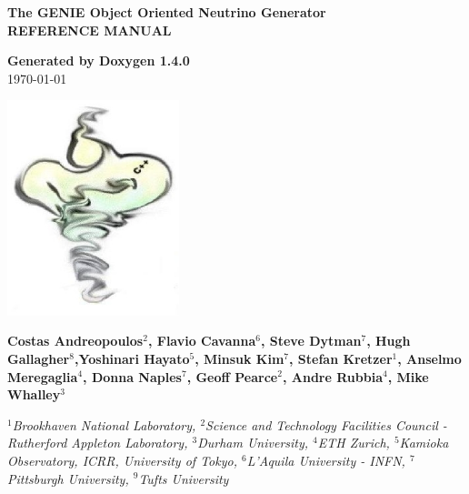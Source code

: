 \documentclass[a4paper]{book}
\begin{document}
\begin{titlepage}
\vspace*{3cm}
\begin{center}

{\Large \textbf{The GENIE Object Oriented Neutrino Generator}}\\
\vspace*{1cm}
{\Large \textbf{REFERENCE MANUAL}}\\
\vspace*{1cm}

{\large \textbf{Generated by Doxygen 1.4.0}}\\
\vspace*{0.5cm}
{\large \today}\\
\vspace*{1cm}

\includegraphics[width=5cm,keepaspectratio]{../../data/logo/genie_logo.eps}

\vspace*{0.6cm}

{\textbf{Costas Andreopoulos$^{2}$, Flavio Cavanna$^{6}$, Steve Dytman$^{7}$,
Hugh Gallagher$^{8}$,Yoshinari Hayato$^{5}$, Minsuk Kim$^{7}$, Stefan Kretzer$^{1}$, Anselmo Meregaglia$^{4}$,
Donna Naples$^{7}$, Geoff Pearce$^{2}$, Andre Rubbia$^{4}$, Mike Whalley$^{3}$}}\\
\vspace*{0.5cm}

{\textit{
$^{1}$Brookhaven National Laboratory, 
$^{2}$Science and Technology Facilities Council - Rutherford Appleton Laboratory,
$^{3}$Durham University, 
$^{4}$ETH Zurich, 
$^{5}$Kamioka Observatory, ICRR, University of Tokyo, 
$^{6}$L'Aquila University - INFN, 
$^{7}$Pittsburgh University, $^{9}$Tufts University}}

\end{center}
\end{titlepage}
\clearemptydoublepage
{}
\tableofcontents
\clearemptydoublepage
{}
\end{document}

